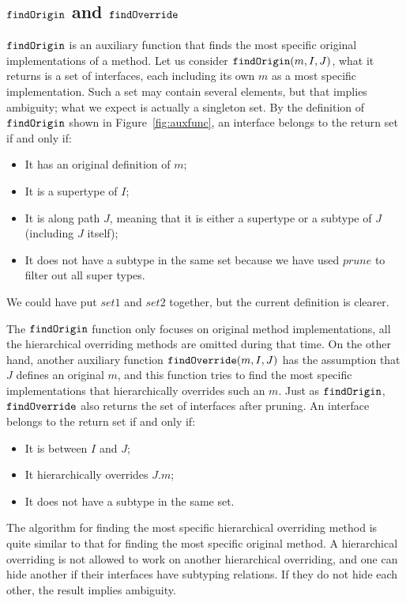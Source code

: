 \subsection{$\texttt{findOrigin}$ and $\texttt{findOverride}$}

$\texttt{findOrigin}$ is an auxiliary function that finds the most specific original implementations of a method. Let us consider $\texttt{findOrigin}(m, I, J)$, what it returns is a set of interfaces, each including its own $m$ as a most specific implementation. Such a set may contain several elements, but that implies ambiguity; what we expect is actually a singleton set. By the definition of $\texttt{findOrigin}$ shown in Figure~\ref{fig:auxfunc}, an interface belongs to the return set if and only if:
\begin{itemize}
    \item It has an original definition of $m$;
    \item It is a supertype of $I$;
    \item It is along path $J$, meaning that it is either a supertype or a subtype of $J$ (including $J$ itself);
    \item It does not have a subtype in the same set because we have used $prune$ to filter out all super types.
\end{itemize}
We could have put $set1$ and $set2$ together, but the current
definition is clearer.

The $\texttt{findOrigin}$ function only focuses on original method implementations, all the hierarchical overriding methods are omitted during that time. On the other hand, another auxiliary function $\texttt{findOverride}(m, I, J)$ has the assumption that $J$ defines an original $m$, and this function tries to find the most specific implementations that hierarchically overrides such an $m$. Just as $\texttt{findOrigin}$, $\texttt{findOverride}$ also returns the set of interfaces after pruning. An interface belongs to the return set if and only if:
\begin{itemize}
    \item It is between $I$ and $J$;
    \item It hierarchically overrides $J.m$;
    \item It does not have a subtype in the same set.
\end{itemize}
The algorithm for finding the most specific hierarchical overriding method is quite similar to that for finding the most specific original method. A hierarchical overriding is not allowed to work on another hierarchical overriding, and one can hide another if their interfaces have subtyping relations. If they do not hide each other, the result implies ambiguity.


